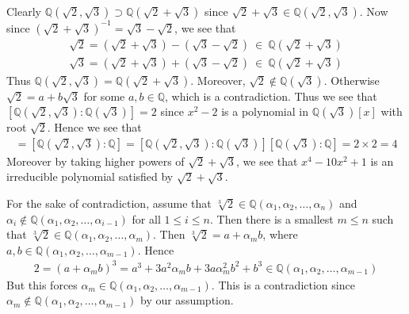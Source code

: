 \documentclass[12pt]{exam}
\theoremstyle{plain} %
\theoremstyle{definition} %
\theoremstyle{remark} %
\begin{document}
\begin{questions}
  \question
  \begin{solution}
    Clearly $\mathbb{Q}(\sqrt{2}, \sqrt{3}) \supset
    \mathbb{Q}(\sqrt{2} + \sqrt{3})$ since $\sqrt{2} +
    \sqrt{3} \in \mathbb{Q}(\sqrt{2}, \sqrt{3})$. Now since
    $(\sqrt{2} + \sqrt{3})^{-1} = \sqrt{3} - \sqrt{2}$, we see that
    \begin{align*}
      \sqrt{2} = (\sqrt{2} + \sqrt{3}) - (\sqrt{3} - \sqrt{2}) \ \in \
      \mathbb{Q}(\sqrt{2} + \sqrt{3}) \\
      \sqrt{3} = (\sqrt{2} + \sqrt{3}) + (\sqrt{3} - \sqrt{2}) \ \in \
      \mathbb{Q}(\sqrt{2} + \sqrt{3})
    \end{align*}
    Thus $\mathbb{Q}(\sqrt{2}, \sqrt{3}) = \mathbb{Q}(\sqrt{2} +
    \sqrt{3})$. Moreover, $\sqrt{2} \notin \mathbb{Q}(\sqrt{3})$.
    Otherwise $\sqrt{2} = a + b \sqrt{3}$ for some $a, b \in
    \mathbb{Q}$, which is a contradiction. Thus we see that
    $[\mathbb{Q}(\sqrt{2}, \sqrt{3}): \mathbb{Q}(\sqrt{3})] = 2$
    since $x^2 -2$ is a polynomial in $\mathbb{Q}(\sqrt{3})[x]$ with
    root $\sqrt{2}$.
    Hence we see that
    \begin{align*}
      [\mathbb{Q}(\sqrt{2} + \sqrt{3}): \mathbb{Q}] =
      [\mathbb{Q}(\sqrt{2}, \sqrt{3}): \mathbb{Q}] =
      [\mathbb{Q}(\sqrt{2}, \sqrt{3}):
      \mathbb{Q}(\sqrt{3})][\mathbb{Q}(\sqrt{3}): \mathbb{Q}] = 2 \times 2 = 4
    \end{align*}
    Moreover by taking higher powers of $\sqrt{2} + \sqrt{3}$, we see
    that $x^4 - 10x^2 +1$ is an irreducible polynomial satisfied by
    $\sqrt{2} + \sqrt{3}$.
  \end{solution}

  \question
  \begin{solution}
    For the sake of contradiction, assume that $\sqrt[3]{2} \in
    \mathbb{Q}(\alpha_1 , \alpha_2 , \ldots , \alpha_n)$ and
    $\alpha_i \notin \mathbb{Q}(\alpha_1 , \alpha_2 , \ldots ,
    \alpha_{i-1})$ for all $1 \le i \le n$. Then there
    is a smallest $m \le n$ such that $\sqrt[3]{2} \in
    \mathbb{Q}(\alpha_1 , \alpha_2 , \ldots , \alpha_m)$. Then
    $\sqrt[3]{2} = a + \alpha_m b$, where $a, b \in
    \mathbb{Q}(\alpha_1 , \alpha_2 , \ldots, \alpha_{m-1})$. Hence
    \begin{align*}
      2 = (a + \alpha_m b)^3 =  a^3 + 3a^2 \alpha_m b + 3a \alpha_m^2
      b^2 + b^3 \in \mathbb{Q}(\alpha_1 , \alpha_2 , \ldots , \alpha_{m-1})
    \end{align*}
    But this forces $\alpha_m \in \mathbb{Q}(\alpha_1 , \alpha_2 ,
    \ldots , \alpha_{m-1})$. This is a contradiction
    since $\alpha_m \notin \mathbb{Q}(\alpha_1 , \alpha_2 , \ldots ,
    \alpha_{m-1})$ by our assumption.

  \end{solution}

\end{questions}
\printbibliography[heading=bibintoc]
\end{document}
